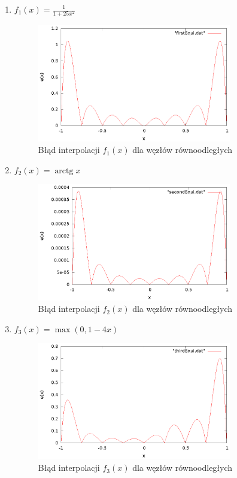 \documentclass{article}
\DeclareMathOperator{\arctg}{arctg}
\begin{document}
\begin{enumerate}
\item $f_1(x) = \frac{1}{1 + 25x^2}$\\
\begin{figure}[H]
	\centering
    \includegraphics[width=0.8\textwidth]{wykresy/firstEqui.eps}
    \caption{Błąd interpolacji $f_1(x)$ dla węzłów równoodległych}
\end{figure}


\item $f_2(x) = \arctg x$ \\
\begin{figure}[H]
	\centering
    \includegraphics[width=0.8\textwidth]{wykresy/secondEqui.eps}
    \caption{Błąd interpolacji $f_2(x)$ dla węzłów równoodległych}
\end{figure}

\item $f_3(x) = \max(0, 1 - 4x)$\\
\begin{figure}[H]
	\centering
    \includegraphics[width=0.8\textwidth]{wykresy/thirdEqui.eps}
    \caption{Błąd interpolacji $f_3(x)$ dla węzłów równoodległych}
\end{figure}
\end{enumerate}
\end{document}
